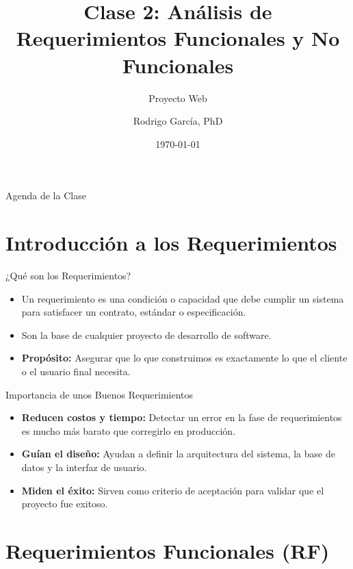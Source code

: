 \documentclass{beamer}
\title[Clase 2: Requerimientos]{Clase 2: Análisis de Requerimientos Funcionales y No Funcionales}
\subtitle{Proyecto Web}
\author{Rodrigo García, PhD}
\date{\today}
\begin{document}
\begin{frame}
    \titlepage
\end{frame}

\begin{frame}{Agenda de la Clase}
    \tableofcontents
\end{frame}

\section{Introducción a los Requerimientos}

\begin{frame}{¿Qué son los Requerimientos?}
    \begin{itemize}
        \item Un requerimiento es una condición o capacidad que debe cumplir un sistema para satisfacer un contrato, estándar o especificación.
        \item Son la base de cualquier proyecto de desarrollo de software.
        \item \textbf{Propósito:} Asegurar que lo que construimos es exactamente lo que el cliente o el usuario final necesita.
    \end{itemize}
\end{frame}

\begin{frame}{Importancia de unos Buenos Requerimientos}
    \begin{itemize}
        \item \textbf{Reducen costos y tiempo:} Detectar un error en la fase de requerimientos es mucho más barato que corregirlo en producción.
        \item \textbf{Guían el diseño:} Ayudan a definir la arquitectura del sistema, la base de datos y la interfaz de usuario.
        \item \textbf{Miden el éxito:} Sirven como criterio de aceptación para validar que el proyecto fue exitoso.
    \end{itemize}
\end{frame}

\section{Requerimientos Funcionales (RF)}
\end{document}
